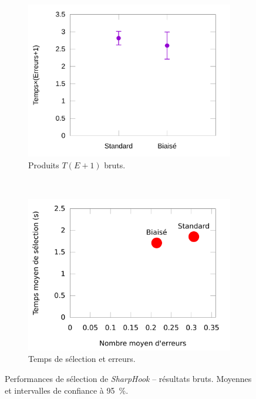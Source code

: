 \begin{figure}[!htb]
\begin{subfigure}[t]{0.49\textwidth}
			\includegraphics[width=\textwidth]{figures/ch5/hookRawProducts}
			\caption{Produits $T(E+1)$ bruts.}
			\label{fig:hookRawProducts}
		\end{subfigure}
		~
		\begin{subfigure}[t]{0.49\textwidth}
			\centering
			\includegraphics[width=\textwidth]{figures/ch5/rawHookErrorsTimesScatter}
			\caption{Temps de sélection et erreurs.}
			\label{fig:rawHookErrorsTimesScatter}
		\end{subfigure}
		\caption[\emph{SharpHook} -- résultats bruts]{Performances de sélection de \emph{SharpHook} -- résultats bruts. Moyennes et intervalles de confiance à 95~\%{}.}
		\label{fig:rawHookPerfs}
	\end{figure}
	
